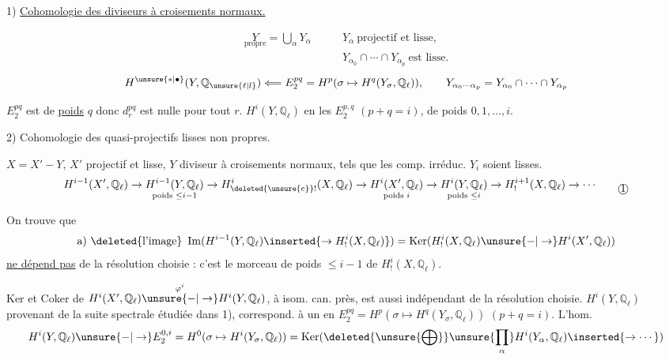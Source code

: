 1) \uline{Cohomologie des diviseurs à croisements normaux.}

\[
\begin{aligned}
\underset{\text{propre}}{Y}=\bigcup_\alpha Y_\alpha\qquad &Y_\alpha\ \text{projectif et lisse,}\\
&Y_{\alpha_0}\cap\cdots\cap Y_{\alpha_p}\ \text{est lisse.}
\end{aligned}
\]
\[
H^{\unsure{*|\bullet}}(Y,\mathbb{Q}_{\unsure{\ell|l}})\Longleftarrow E_2^{pq}=H^p(\sigma\mapsto H^q(Y_\sigma,\mathbb{Q}_\ell)),\qquad
Y_{\alpha_0\cdots\alpha_p}=Y_{\alpha_0}\cap\cdots\cap Y_{\alpha_p}
\]
 

$E_2^{pq}$ est de \uline{poids} $q$ donc $d_r^{pq}$ est nulle pour tout $r$.
$H^i(Y,\mathbb{Q}_\ell)$  en les $E_2^{p,q}$ $(p+q=i)$, de poids $0,1,\ldots,i$.

2) Cohomologie des   quasi-projectifs lisses non propres.

$X=X'-Y$, $X'$ projectif et lisse, $Y$ diviseur à croisements normaux, tels que les comp. irréduc. $Y_i$ soient lisses.
\[
\begin{aligned}
H^{i-1}(X',\mathbb{Q}_\ell)\to\underset{\text{poids }\leq i-1}{H^{i-1}(Y,\mathbb{Q}_\ell)}\to H^i_{\deleted{\unsure{c}}!}(X,\mathbb{Q}_\ell)\to\underset{\text{poids }i}{H^i(X',\mathbb{Q}_\ell)}\to\underset{\text{poids }\leq i}{H^i(Y,\mathbb{Q}_\ell)}\to H^{i+1}_!(X,\mathbb{Q}_\ell)\to\cdots
\end{aligned}
\tag*{\textcircled{1}}
\]

On trouve que
\[
\text{a) }\deleted{\text{l'image}}\ \operatorname{Im}(H^{i-1}(Y,\mathbb{Q}_\ell)\inserted{\to H^i_!(X,\mathbb{Q}_\ell)})=\operatorname{Ker}(H^i_!(X,\mathbb{Q}_\ell)\unsure{-|\to}H^i(X',\mathbb{Q}_\ell))
\]
\uline{ne dépend pas} de la résolution choisie : c'est le morceau de poids $\leq i-1$ de $H^i_!(X,\mathbb{Q}_\ell)$.


 Ker et Coker de $H^i(X',\mathbb{Q}_\ell)\overset{\varphi^i}{\unsure{-|\to}}H^i(Y,\mathbb{Q}_\ell)$, à isom. can. près, est aussi indépendant de la résolution choisie.   $H^i(Y,\mathbb{Q}_\ell)$ provenant de la suite spectrale étudiée dans 1), correspond. à un  en $E_2^{pq}=H^p(\sigma\mapsto H^q(Y_\sigma,\mathbb{Q}_\ell))$ $(p+q=i)$. L'hom.
\[
H^i(Y,\mathbb{Q}_\ell)\unsure{-|\to}E_2^{0,i}=H^0(\sigma\mapsto H^i(Y_\sigma,\mathbb{Q}_\ell))=\operatorname{Ker}(\deleted{\unsure{\bigoplus}}\unsure{\prod_\alpha}H^i(Y_\alpha,\mathbb{Q}_\ell)\inserted{\to\cdots})
\]
